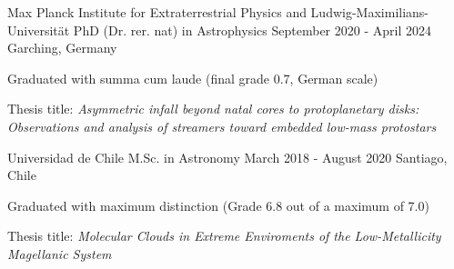 \vspace{10pt}

\begin{cventries}

 \cventry
    {Max Planck Institute for Extraterrestrial Physics and Ludwig-Maximilians-Universit\"at} %
    {PhD (Dr. rer. nat) in Astrophysics} %
    {September 2020 - April 2024} %
    {Garching, Germany} %
    { \begin{cvitems} %
      \item{Graduated with summa cum laude (final grade 0.7, German scale)}
      \item{Thesis title: \textit{Asymmetric infall beyond natal cores to protoplanetary disks: Observations and analysis of streamers toward embedded low-mass protostars}}
      \end{cvitems}
      }


 \cventry
    {Universidad de Chile} %
    {M.Sc. in Astronomy} %
    {March 2018 - August 2020} %
    {Santiago, Chile} %
    {\begin{cvitems} %
            \item {Graduated with maximum distinction (Grade 6.8 out of a maximum of 7.0)}
    		\item {Thesis title: \textit{Molecular Clouds in Extreme Enviroments of the Low-Metallicity Magellanic System}}
    	\end{cvitems} }
    


\end{cventries}
